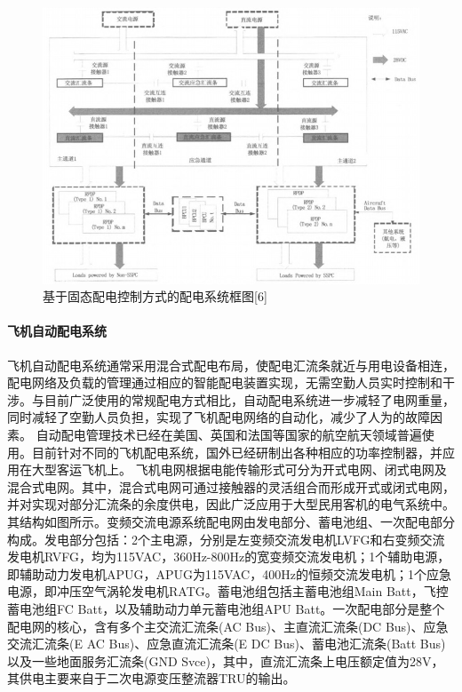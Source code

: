 \documentclass[12pt,a4paper]{report}
\begin{document}
\begin{figure}[htp]
\centering
   \includegraphics[width=.8\textwidth]{eletricdistribution.jpg}
    \caption{基于固态配电控制方式的配电系统框图[6]}
    \label{fig:distribution}
\end{figure}
 
\paragraph{飞机自动配电系统}
飞机自动配电系统通常采用混合式配电布局，使配电汇流条就近与用电设备相连，配电网络及负载的管理通过相应的智能配电装置实现，无需空勤人员实时控制和干涉。与目前广泛使用的常规配电方式相比，自动配电系统进一步减轻了电网重量，同时减轻了空勤人员负担，实现了飞机配电网络的自动化，减少了人为的故障因素。
自动配电管理技术已经在美国、英国和法国等国家的航空航天领域普遍使用。目前针对不同的飞机配电系统，国外已经研制出各种相应的功率控制器，并应用在大型客运飞机上。
飞机电网根据电能传输形式可分为开式电网、闭式电网及混合式电网。其中，混合式电网可通过接触器的灵活组合而形成开式或闭式电网，并对实现对部分汇流条的余度供电，因此广泛应用于大型民用客机的电气系统中。其结构如图所示。变频交流电源系统配电网由发电部分、蓄电池组、一次配电部分构成。发电部分包括：2个主电源，分别是左变频交流发电机LVFG和右变频交流发电机RVFG，均为115VAC，360Hz-800Hz的宽变频交流发电机；1个辅助电源，即辅助动力发电机APUG，APUG为115VAC，400Hz的恒频交流发电机；1个应急电源，即冲压空气涡轮发电机RATG。蓄电池组包括主蓄电池组Main Batt，飞控蓄电池组FC Batt，以及辅助动力单元蓄电池组APU Batt。一次配电部分是整个配电网的核心，含有多个主交流汇流条(AC Bus)、主直流汇流条(DC Bus)、应急交流汇流条(E AC Bus)、应急直流汇流条(E DC Bus)、蓄电池汇流条(Batt Bus)以及一些地面服务汇流条(GND Svce)，其中，直流汇流条上电压额定值为28V，其供电主要来自于二次电源变压整流器TRU的输出。
\end{document}
